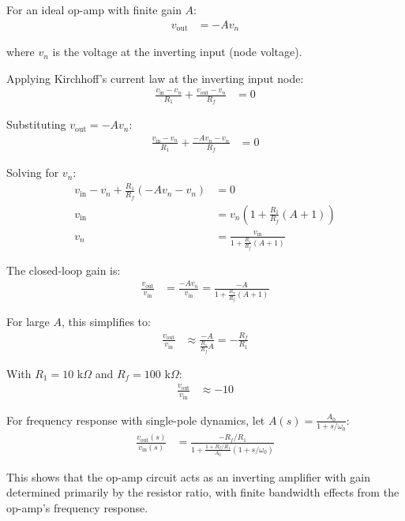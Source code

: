 \documentclass[11pt,a4paper]{article}
\begin{document}
For an ideal op-amp with finite gain $A$:
\begin{align}
v_{\text{out}} &= -A v_n
\end{align}

where $v_n$ is the voltage at the inverting input (node voltage).

Applying Kirchhoff's current law at the inverting input node:
\begin{align}
\frac{v_{\text{in}} - v_n}{R_1} + \frac{v_{\text{out}} - v_n}{R_f} &= 0
\end{align}

Substituting $v_{\text{out}} = -Av_n$:
\begin{align}
\frac{v_{\text{in}} - v_n}{R_1} + \frac{-Av_n - v_n}{R_f} &= 0
\end{align}

Solving for $v_n$:
\begin{align}
v_{\text{in}} - v_n + \frac{R_1}{R_f}(-Av_n - v_n) &= 0 \\
v_{\text{in}} &= v_n\left(1 + \frac{R_1}{R_f}(A + 1)\right) \\
v_n &= \frac{v_{\text{in}}}{1 + \frac{R_1}{R_f}(A + 1)}
\end{align}

The closed-loop gain is:
\begin{align}
\frac{v_{\text{out}}}{v_{\text{in}}} &= \frac{-Av_n}{v_{\text{in}}} = \frac{-A}{1 + \frac{R_1}{R_f}(A + 1)}
\end{align}

For large $A$, this simplifies to:
\begin{align}
\frac{v_{\text{out}}}{v_{\text{in}}} &\approx \frac{-A}{\frac{R_1}{R_f}A} = -\frac{R_f}{R_1}
\end{align}

With $R_1 = 10$ k$\Omega$ and $R_f = 100$ k$\Omega$:
\begin{align}
\frac{v_{\text{out}}}{v_{\text{in}}} &\approx -10
\end{align}

For frequency response with single-pole dynamics, let $A(s) = \frac{A_0}{1 + s/\omega_0}$:
\begin{align}
\frac{v_{\text{out}}(s)}{v_{\text{in}}(s)} &= \frac{-R_f/R_1}{1 + \frac{1 + R_f/R_1}{A_0}(1 + s/\omega_0)}
\end{align}

This shows that the op-amp circuit acts as an inverting amplifier with gain determined primarily by the resistor ratio, with finite bandwidth effects from the op-amp's frequency response.
\end{document}
